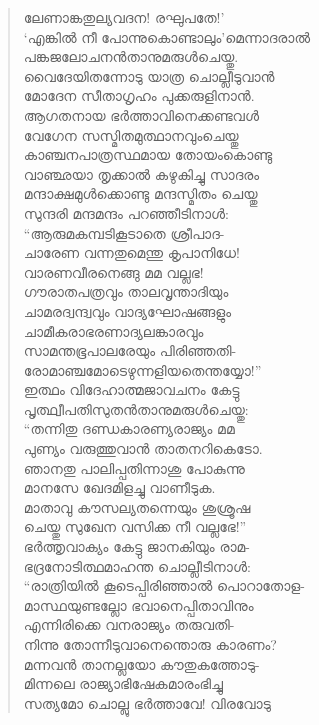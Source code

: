 \begin{verse}
ലേണാങ്കതുല്യവദന! രഘുപതേ!’\\
‘എങ്കില്‍ നീ പോന്നുകൊണ്ടാലും’മെന്നാദരാല്‍\\
പങ്കജലോചനന്‍താനുമരുള്‍ചെയ്തു.\\
വൈദേയിതന്നോടു യാത്ര ചൊല്ലീടുവാന്‍\\
മോദേന സീതാഗൃഹം പുക്കരുളിനാന്‍.\\
ആഗതനായ ഭര്‍ത്താവിനെക്കണ്ടവള്‍\\
വേഗേന സസ്മിതമുത്ഥാനവുംചെയ്തു\\
കാഞ്ചനപാത്രസ്ഥമായ തോയംകൊണ്ടു\\
വാഞ്ഛയാ തൃക്കാല്‍ കഴുകിച്ചു സാദരം\\
മന്ദാക്ഷമുള്‍ക്കൊണ്ടു മന്ദസ്മിതം ചെയ്തു\\
സുന്ദരി മന്ദമന്ദം പറഞ്ഞീടിനാള്‍:\\
“ആരുമകമ്പടികൂടാതെ ശ്രീപാദ-\\
ചാരേണ വന്നതുമെന്തു കൃപാനിധേ!\\
വാരണവീരനെങ്ങു മമ വല്ലഭ!\\
ഗൗരാതപത്രവും താലവൃന്താദിയും\\
ചാമരദ്വന്ദ്വവും വാദ്യഘോഷങ്ങളും\\
ചാമീകരാഭരണാദ്യലങ്കാരവും\\
സാമന്തഭൂപാലരേയും പിരിഞ്ഞതി-\\
രോമാഞ്ചമോടെഴുന്നളിയതെന്തയ്യോ!”\\
ഇത്ഥം വിദേഹാത്മജാവചനം കേട്ടു\\
പൃത്ഥ്വീപതിസുതന്‍താനുമരുള്‍ചെയ്തു:\\
“തന്നിതു ദണ്ഡകാരണ്യരാജ്യം മമ\\
പുണ്യം വരുത്തുവാന്‍ താതനറികെടോ.\\
ഞാനതു പാലിപ്പതിന്നാശു പോകുന്നു\\
മാനസേ ഖേദമിളച്ചു വാണീടുക.\\
മാതാവു കൗസല്യതന്നെയും ശുശ്രൂഷ\\
ചെയ്തു സുഖേന വസിക്ക നീ വല്ലഭേ!”\\
ഭര്‍ത്തൃവാക്യം കേട്ടു ജാനകിയും രാമ-\\
ഭദ്രനോടിത്ഥമാഹന്ത ചൊല്ലീടിനാള്‍:\\
“രാത്രിയില്‍ കൂടെപ്പിരിഞ്ഞാല്‍ പൊറാതോള-\\
മാസ്ഥയുണ്ടല്ലോ ഭവാനെപ്പിതാവിനും\\
എന്നിരിക്കെ വനരാജ്യം തരുവതി-\\
നിന്നു തോന്നീടുവാനെന്തൊരു കാരണം?\\
മന്നവന്‍ താനല്ലയോ കൗതുകത്തോടു-\\
മിന്നലെ രാജ്യാഭിഷേകമാരംഭിച്ചു\\
സത്യമോ ചൊല്ലു ഭര്‍ത്താവേ! വിരവോടു\\

\end{verse}
